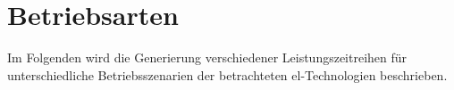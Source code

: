\documentclass[onecolumn,10pt,titlepage]{article}
\begin{document}
%
%
%
%









\section{Betriebsarten}
\label{sect_Betriebsarten}
Im Folgenden wird die Generierung verschiedener Leistungszeitreihen für unterschiedliche Betriebsszenarien der betrachteten \gls{el}-Technologien beschrieben.
\end{document}
